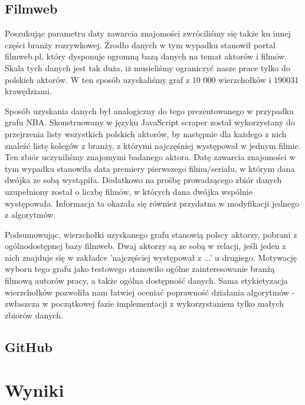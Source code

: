 \documentclass{article}
\begin{document}
\subsection{Filmweb}
Poszukując parametru daty zawarcia znajomości zwróciliśmy się także ku innej części branży rozrywkowej. Źrodło danych w tym wypadku stanowił portal filmweb.pl, który dysponuje ogromną bazą danych na temat aktorów i filmów. Skala tych danych jest tak duża, iż musieliśmy ograniczyć nasze prace tylko do polskich aktorów. W ten sposób uzyskaliśmy graf z 10 000 wierzchołków i 190031 krawędziami.

Sposób uzyskania danych był analogiczny do tego prezentowanego w przypadku grafu NBA. Skonstruowany w języku JavaScript scraper został wykorzystany do przejrzenia listy wszystkich polskich aktorów, by następnie dla każdego z nich znaleźć listę kolegów z branży, z którymi najczęśniej występował w jednym filmie. Ten zbiór uczyniliśmy znajomymi badanego aktora. Datę zawarcia znajomości w tym wypadku stanowiła data premiery pierwszego filmu/serialu, w którym dana dwójka ze sobą wystąpiła. Dodatkowo na prośbę prowadzącego zbiór danych uzupełniony został o liczbę filmów, w których dana dwójka wspólnie występowała. Informacja ta okazała się również przydatna w modyfikacji jednego z algorytmów.

Podsumowując, wierzchołki uzyskanego grafu stanowią polscy aktorzy, pobrani z ogólnodostępnej bazy filmweb. Dwaj aktorzy są ze sobą w relacji, jeśli jeden z nich znajduje się w zakładce 'najczęściej występował z ...' u drugiego. Motywację wyboru tego grafu jako testowego stanowiło ogólne zainteresowanie branżą filmową autorów pracy, a także ogólna dostępność danych. Sama etykietyzacja wierzchołków pozwoliła nam łatwiej oceniać poprawność działania algorytmów - zwłaszcza w początkowej fazie implementacji z wykorzystaniem tylko małych zbiorów danych.

\subsection{GitHub}

\section{Wyniki}
\end{document}
